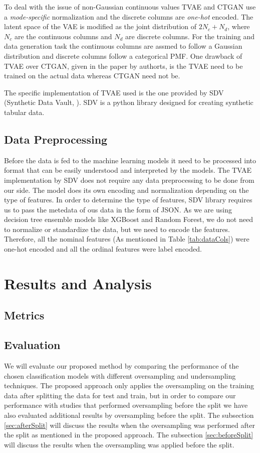 \documentclass[twoside,11pt]{article}
\begin{document}
To deal with the issue of non-Gaussian continuous values TVAE and CTGAN use a \emph{mode-specific} normalization and the discrete columns are \emph{one-hot} encoded. The latent space of the VAE is modified as the joint distribution of \(2N_c + N_d\), where \(N_c\) are the continuous columns and \(N_d\) are discrete columns. For the training and data generation task the continuous columns are assmed to follow a Gaussian distribution and discrete columns follow a categorical PMF. One drawback of TVAE over CTGAN, given in the paper by authorts, is the TVAE need to be trained on the actual data whereas CTGAN need not be. 

The specific implementation of TVAE used is the one provided by SDV (Synthetic Data Vault, \citealp{SDV}). SDV is a python library designed for creating synthetic tabular data.

\subsection{Data Preprocessing}
Before the data is fed to the machine learning models it need to be processed into format that can be easily understood and interpreted by the models. The TVAE implementation by SDV does not require any data preprocessing to be done from our side. The model does its own encoding and normalization depending on the type of features. In order to determine the type of features, SDV library requires us to pass the metedata of ous data in the form of JSON. As we are using decision tree ensemble models like XGBoost and Random Forest, we do not need to normalize or standardize the data, but we need to encode the features. Therefore, all the nominal features (As mentioned in Table \ref{tab:dataCols}) were one-hot encoded and all the ordinal features were label encoded.

\section{Results and Analysis}  \label{sec:result}
\subsection{Metrics}

\subsection{Evaluation}
We will evaluate our proposed method by comparing the performance of the chosen classification models with different oversampling and undersampling techniques. The proposed approach only applies the oversampling on the training data after splitting the data for test and train, but in order to compare our performance with studies that performed oversampling before the split we have also evaluated additional results by oversampling before the split. The subsection \ref{sec:afterSplit} will discuss the results when the oversampling was performed after the split as mentioned in the proposed approach. The subsection \ref{sec:beforeSplit} will discuss the results when the oversampling was applied before the split.
\end{document}
